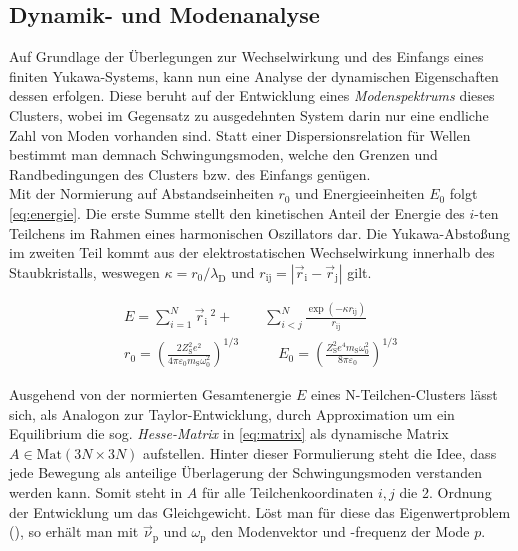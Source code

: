 \documentclass[numbers=noenddot,a4paper,notitlepage,twoside,BCOR15mm]{scrbook}
\newcommand{\ix}[1]{_\text{#1}}
\newcommand{\tilt}[1]{\textit{#1}}
\begin{document}
				\subsection{Dynamik- und Modenanalyse} \label{subsub:moden}

					Auf Grundlage der Überlegungen zur Wechselwirkung und des Einfangs eines finiten Yukawa-Systems, kann nun eine Analyse der dynamischen Eigenschaften dessen erfolgen. Diese beruht auf der Entwicklung eines \tilt{Modenspektrums} dieses Clusters, wobei im Gegensatz zu ausgedehnten System darin nur eine endliche Zahl von Moden vorhanden sind. Statt einer Dispersionsrelation für Wellen bestimmt man demnach Schwingungsmoden, welche den Grenzen und Randbedingungen des Clusters bzw. des Einfangs genügen.\\
					Mit der Normierung auf Abstandseinheiten $r\ix{0}$ und Energieeinheiten $E\ix{0}$ folgt \autoref{eq:energie}. Die erste Summe stellt den kinetischen Anteil der Energie des $i$-ten Teilchens im Rahmen eines harmonischen Oszillators dar. Die Yukawa-Abstoßung im zweiten Teil kommt aus der elektrostatischen Wechselwirkung innerhalb des Staubkristalls, weswegen $\kappa=r\ix{0}/\lambda\ix{D}$ und $r\ix{ij}=|\vec{r}\ix{i}-\vec{r}\ix{j}|$ gilt.

						\begin{align}
							E=\sum_{i=1}^{N}\vec{r}\ix{i}\,^2+&\sum_{i<j}^{N}\frac{\exp\left(-\kappa r\ix{ij}\right)}{r\ix{ij}} \label{eq:energie} \\
							r\ix{0}=\left(\frac{2Z\ix{S}^2e^2}{4\pi\varepsilon\ix{0}m\ix{S}\omega\ix{0}^2}\right)^{1/3} \quad &\quad E\ix{0}=\left(\frac{Z\ix{S}^2e^4m\ix{S}\omega\ix{0}^2}{8\pi\varepsilon\ix{0}}\right)^{1/3} \nonumber
						\end{align}

					Ausgehend von der normierten Gesamtenergie $E$ eines N-Teilchen-Clusters lässt sich, als Analogon zur Taylor-Entwicklung, durch Approximation um ein Equilibrium die sog. \tilt{Hesse-Matrix} in \autoref{eq:matrix} als dynamische Matrix $A\in\text{Mat}\left(3N\times3N\right)$ aufstellen. Hinter dieser Formulierung steht die Idee, dass jede Bewegung als anteilige Überlagerung der Schwingungsmoden verstanden werden kann. Somit steht in $A$ für alle Teilchenkoordinaten $i,j$ die 2. Ordnung der Entwicklung um das Gleichgewicht. Löst man für diese das Eigenwertproblem (\cite{Schweigert95c}), so erhält man mit $\vec{\nu}\ix{p}$ und $\omega\ix{p}$ den Modenvektor und -frequenz der Mode $p$.
\end{document}
